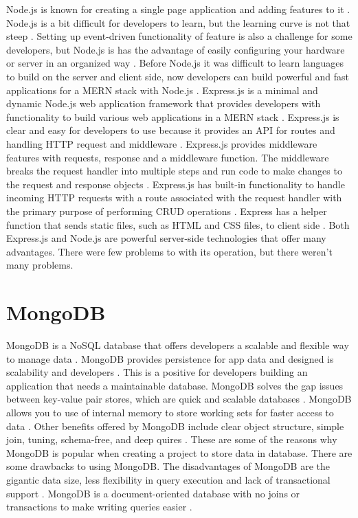Node.js is known for creating a single page application and adding features to it \cite{shah2017node}. Node.js is a bit difficult for developers to learn, but the learning curve is not that steep \cite{shah2017node}. Setting up event-driven functionality of feature is also a challenge for some developers, but Node.js is has the advantage of easily configuring your hardware or server in an organized way \cite{shah2017node}. Before Node.js it was difficult to learn languages to build on the server and client side, now developers can build powerful and fast applications for a MERN stack with Node.js \cite{shah2017node}.
Express.js is a minimal and dynamic Node.js web application framework that provides developers with functionality to build various web applications in a MERN stack \cite{ishaq2023design}. Express.js is clear and easy for developers to use because it provides an API for routes and handling HTTP request and middleware \cite{ishaq2023design}. Express.js provides middleware features with requests, response and a middleware function. The middleware breaks the request handler into multiple steps and run code to make changes to the request and response objects \cite{peters2017building}. Express.js has built-in functionality to handle incoming HTTP requests with a route associated with the request handler with the primary purpose of performing CRUD operations \cite{peters2017building}. Express has a helper function that sends static files, such as HTML and CSS files, to client side
\cite{peters2017building}. Both Express.js and Node.js are powerful server-side technologies that offer many advantages. There were few problems to with its operation, but there weren't many problems.

\section{MongoDB}
MongoDB is a NoSQL database that offers developers a scalable and flexible way to manage data \cite{ishaq2023design}. MongoDB provides persistence for app data and designed is scalability and developers \cite{aggarwal2018comparative}. This is a positive for developers building an application that needs a maintainable database. MongoDB solves the gap issues between key-value pair stores, which are quick and scalable databases \cite{aggarwal2018comparative}. MongoDB allows you to use of internal memory to store working sets for faster access to data \cite{aggarwal2018comparative}. Other benefits offered by MongoDB include clear object structure, simple join, tuning, schema-free, and deep quires \cite{aggarwal2018comparative}. These are some of the reasons why MongoDB is popular when creating a project to store data in database. There are some drawbacks to using MongoDB. The disadvantages of MongoDB are the gigantic data size, less flexibility in query execution and lack of
transactional support \cite{aggarwal2018comparative}. MongoDB is a document-oriented database with no joins or transactions to make writing queries easier \cite{zhao2013modeling}.

